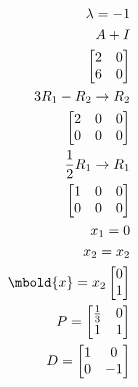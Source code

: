 \documentclass[12pt letter]{report}
\begin{document}
{\begin{enumerate}
\begin{align*}
            \\
            \\
            \lambda = -1                                                              \\
            A + I                                                                     \\
            \begin{bmatrix}
              2 & 0 \\
              6 & 0 \\
            \end{bmatrix}                                                            \\
            3R_1 - R_2  \rightarrow R_2                                               \\
            \begin{bmatrix}
              2 & 0 & 0 \\
              0 & 0 & 0 \\
            \end{bmatrix}
            \\
            \frac{1}{2}R_1 \to R_1                                                    \\
            \begin{bmatrix}
              1 & 0 & 0 \\
              0 & 0 & 0 \\
            \end{bmatrix}
            \\
            x_1 = 0                                                                   \\
            x_2 = x_2                                                                 \\
            \mbold{x} = x_2\begin{bmatrix} 0  \\ 1 \end{bmatrix}
            \\
            P = \begin{bmatrix}
                  \frac{1}{3} & 0 \\
                  1           & 1
                \end{bmatrix}                                                       \\
            D = \begin{bmatrix}
                  1 & 0  \\
                  0 & -1
                \end{bmatrix}
          \end{align*}
  \end{enumerate}
}
\end{document}
